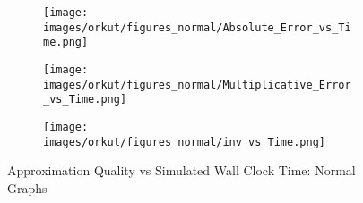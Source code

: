 \begin{figure*}[htbp]
\begin{subfigure}[b]{\textwidth}
	\centering
	\begin{minipage}[b]{0.05\textwidth}
		\centering
	\end{minipage}%
	\begin{minipage}[b]{0.3\textwidth}
		\centering
		\texttt{[image: images/orkut/figures\_normal/Absolute\_Error\_vs\_Time.png]} %
		
	\end{minipage}%
	\begin{minipage}[b]{0.3\textwidth}
		\centering
		\texttt{[image: images/orkut/figures\_normal/Multiplicative\_Error\_vs\_Time.png]} %
		
	\end{minipage}%
	\begin{minipage}[b]{0.3\textwidth}
		\centering
		\texttt{[image: images/orkut/figures\_normal/inv\_vs\_Time.png]} %
	\end{minipage}
\end{subfigure}	
	\caption{Approximation Quality vs Simulated Wall Clock Time: Normal Graphs}
	\label{fig:accuracy_time_normal_graphs_1}
\end{figure*}





